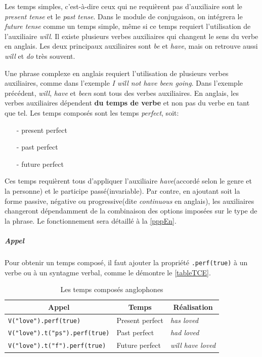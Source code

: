 \documentclass[11pt]{article} %
\newcommand{\real}[1]{\emph{#1}}
\begin{document}
Les temps simples, c'est-à-dire ceux qui ne requièrent pas d'auxiliaire
sont le \emph{present tense} et le \emph{past tense}. Dans le module de
conjugaison, on intégrera le \emph{future tense} comme un temps simple, même si 
ce temps requiert l'utilisation de l'auxiliaire \emph{will}.
Il existe plusieurs verbes auxiliaires qui changent
le sens du verbe en anglais. Les deux principaux auxiliaires sont \emph{be}
et \emph{have}, mais on retrouve aussi \emph{will} et \emph{do} très souvent.

Une phrase complexe en anglais requiert l'utilisation de plusieurs verbes auxiliaires,
comme dans l'exemple \real{I will not have been going}. Dans l'exemple
précédent, \emph{will}, \emph{have} et \emph{been} sont tous des verbes
auxiliaires. En anglais,
les verbes auxiliaires dépendent \textbf{du temps de verbe} et non pas du 
verbe en tant que tel. Les temps composés sont les
temps \emph{perfect}, soit:
\begin{itemize}
\item[-]present perfect
\item[-]past perfect
\item[-]future perfect
\end{itemize} Ces temps requièrent tous d'appliquer l'auxiliaire
\emph{have}(accordé selon le genre et la personne) et le participe passé(invariable). Par contre, en ajoutant soit la forme passive, négative ou progressive(dite \emph{continuous}
en anglais), les auxiliaires changeront dépendamment de la combinaison
des options imposées sur le type de la phrase. Le fonctionnement sera détaillé à la \autoref{pppEn}.

\subparagraph{Appel}

Pour obtenir un temps composé, il faut ajouter la propriété \texttt{.perf(true)} à un verbe ou à un syntagme verbal, comme le démontre le \autoref{tableTCE}.

\begin{table}[ht]
\caption{Les temps composés anglophones}
\centering
\begin{tabular}{|l|l|l|}
\hline
\multicolumn{1}{|c}{Appel} & \multicolumn{1}{|c}{Temps} & \multicolumn{1}{|c|}{Réalisation} \\
\hline
\hline
\texttt{V("love").perf(true)} & Present perfect & \real{has loved} \\
\hline
\texttt{V("love").t("ps").perf(true)} & Past perfect & \real{had loved} \\
\hline
\texttt{V("love").t("f").perf(true)} & Future perfect & \real{will have loved} \\
\hline
\end{tabular}
\label{tableTCE}
\end{table}
\end{document}
